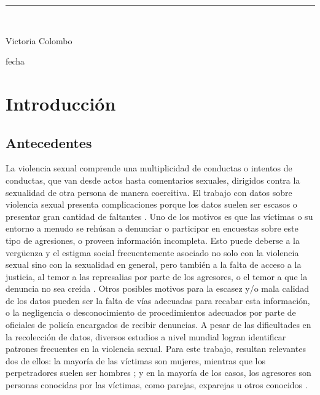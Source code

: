 \documentclass[10 pt]{article}
\begin{document}
\begin{titlepage}
\begin{center}
    
    \vspace*{0.3in}
    \rule{80mm}{0.1mm}\\
    \vspace*{0.1in}
    \begin{large}
    Victoria Colombo
    
    \vspace*{0.3in}
    
    \vspace*{0.1in}fecha
    \end{large}
    \end{center}
    
    \end{titlepage}

\newpage

\begin{abstract}


\end{abstract}
\newpage
\tableofcontents
\newpage

\section{Introducción}\label{intro}

\subsection{Antecedentes}


La violencia sexual comprende una multiplicidad de conductas o intentos de conductas, que van desde actos hasta comentarios sexuales, dirigidos contra la sexualidad de otra persona de manera coercitiva. El trabajo con datos sobre violencia sexual presenta complicaciones porque los datos suelen ser escasos o presentar gran cantidad de faltantes \citetext{\citealp[p.~150]{ferris2002world}}. Uno de los motivos es que las víctimas o su entorno a menudo se rehúsan a denunciar o participar en encuestas sobre este tipo de agresiones, o proveen información incompleta. Esto puede deberse a la vergüenza y el estigma social frecuentemente asociado no solo con la violencia sexual sino con la sexualidad en general, pero también a la falta de acceso a la justicia, al temor a las represalias por parte de los agresores, o el temor a que la denuncia no sea creída \citetext{\citealp{murphy2022unfounded}}. Otros posibles motivos para la escasez y/o mala calidad de los datos pueden ser la falta de vías adecuadas para recabar esta información, o la negligencia o desconocimiento de procedimientos adecuados por parte de oficiales de policía encargados de recibir denuncias. A pesar de las dificultades en la recolección de datos, diversos estudios a nivel mundial logran identificar patrones frecuentes en la violencia sexual. Para este trabajo, resultan relevantes dos de ellos: la mayoría de las víctimas son mujeres, mientras que los perpetradores suelen ser hombres \citetext{\citealp[p.~149]{ferris2002world}; \citealp[p.~15]{contreras2016violencia}}; y en la mayoría de los casos, los agresores son personas conocidas por las víctimas, como parejas, exparejas u otros conocidos \citetext{\citealp[p.~9]{garcia2005multi},\citealp[p.~22]{unicef2018analisis}, \citealp[p.~151]{ferris2002world}}.
 
\end{document}
